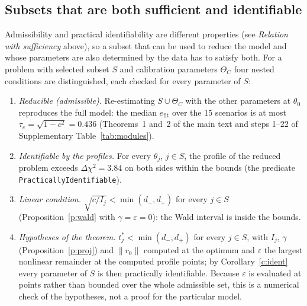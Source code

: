 \subsection*{Subsets that are both sufficient and identifiable}
Admissibility and practical identifiability are different properties (see \emph{Relation with sufficiency} above), so a subset that can be used to reduce the model and whose parameters are also determined by the data has to satisfy both. For a problem with selected subset $S$ and calibration parameters $\Theta_C$ four nested conditions are distinguished, each checked for every parameter of $S$:
\begin{enumerate}\itemsep0pt
\item \emph{Reducible (admissible).} Re-estimating $S\cup\Theta_C$ with the other parameters at $\theta_0$ reproduces the full model: the median $e_{\mathrm{fit}}$ over the 15 scenarios is at most $\tau_e=\sqrt{1-c^2}=0.436$ (Theorems~1 and~2 of the main text and steps 1--22 of Supplementary Table~\ref{tab:modules}).
\item \emph{Identifiable by the profiles.} For every $\theta_j$, $j\in S$, the profile of the reduced problem exceeds $\Delta\chi^2=3.84$ on both sides within the bounds (the predicate \texttt{PracticallyIdentifiable}).
\item \emph{Linear condition.} $\sqrt{c/I_j}<\min(d_-,d_+)$ for every $j\in S$ (Proposition~\ref{p:wald} with $\gamma=\varepsilon=0$): the Wald interval is inside the bounds.
\item \emph{Hypotheses of the theorem.} $t^{\ast}_j<\min(d_-,d_+)$ for every $j\in S$, with $I_j$, $\gamma$ (Proposition~\ref{p:proj}) and $\|r_0\|$ computed at the optimum and $\varepsilon$ the largest nonlinear remainder at the computed profile points; by Corollary~\ref{c:ident} every parameter of $S$ is then practically identifiable. Because $\varepsilon$ is evaluated at points rather than bounded over the whole admissible set, this is a numerical check of the hypotheses, not a proof for the particular model.
\end{enumerate}
